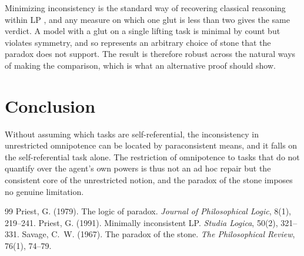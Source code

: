 \documentclass{situationist-preprint}
\begin{document}
\begin{reply}
Minimizing inconsistency is the standard way of recovering classical reasoning within LP \citep{Priest1991}, and any measure on which one glut is less than two gives the same verdict. A model with a glut on a single lifting task is minimal by count but violates symmetry, and so represents an arbitrary choice of stone that the paradox does not support. The result is therefore robust across the natural ways of making the comparison, which is what an alternative proof should show.
\end{reply}

\section{Conclusion}

Without assuming which tasks are self-referential, the inconsistency in unrestricted omnipotence can be located by paraconsistent means, and it falls on the self-referential task alone. The restriction of omnipotence to tasks that do not quantify over the agent's own powers is thus not an ad hoc repair but the consistent core of the unrestricted notion, and the paradox of the stone imposes no genuine limitation.

\begin{thebibliography}{99}\small
{} Priest, G. (1979). The logic of paradox. \emph{Journal of Philosophical Logic}, 8(1), 219--241.
 Priest, G. (1991). Minimally inconsistent LP. \emph{Studia Logica}, 50(2), 321--331.
 Savage, C.~W. (1967). The paradox of the stone. \emph{The Philosophical Review}, 76(1), 74--79.
\end{thebibliography}
\end{document}
